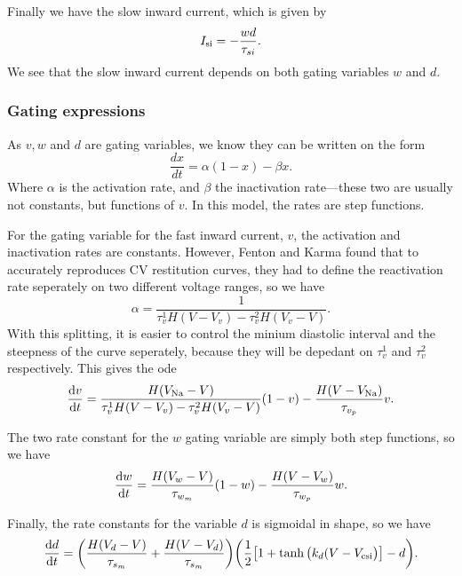 \documentclass[a4paper, 11pt, notitlepage, english]{article}
\renewcommand{\d}{{\rm d}}
\begin{document}
Finally we have the slow inward current, which is given by
$$I_{\rm si} = -\frac{wd}{\tau_{si}}.$$
We see that the slow inward current depends on both gating variables $w$ and $d$.

\subsubsection*{Gating expressions}

As $v, w$ and $d$ are gating variables, we know they can be written on the form
$$\frac{dx}{dt} = \alpha (1-x) - \beta x.$$
Where $\alpha$ is the activation rate, and $\beta$ the inactivation rate---these two are usually not constants, but functions of $v$. In this model, the rates are step functions.

For the gating variable for the fast inward current, $v$, the activation and inactivation rates are constants. However, Fenton and Karma found that to accurately reproduces CV restitution curves, they had to define the reactivation rate seperately on two different voltage ranges, so we have
$$\alpha = \frac{1}{\tau_{v}^1H(V-V_v) - \tau_v^2 H(V_v - V)}.$$
With this splitting, it is easier to control the minium diastolic interval and the steepness of the curve seperately, because they will be depedant on $\tau_{v}^1$ and $\tau_{v}^2$ respectively. This gives the ode
$$\frac{\d v}{\d t} = \frac{H(V_{\rm Na}-V)}{\tau_{v}^1H(V-V_v) - \tau_v^2 H(V_v - V)}(1-v) - \frac{H(V-V_{\rm Na})}{\tau_{v_p}}v.$$

The two rate constant for the $w$ gating variable are simply both step functions, so we have
$$\frac{\d w}{\d t} = \frac{H(V_w - V)}{\tau_{w_m}}(1-w) - \frac{H(V-V_w)}{\tau_{w_p}}w.$$

Finally, the rate constants for the variable $d$ is sigmoidal in shape, so we have
$$\frac{\d d}{\d t} = \bigg(\frac{H(V_d - V)}{\tau_{s_m}} + \frac{H(V-V_d)}{\tau_{s_m}}\bigg)\bigg(\frac{1}{2}\big[1+\tanh\big(k_d(V-V_{\rm csi}\big)\big]-d\bigg).$$





















\end{document}
